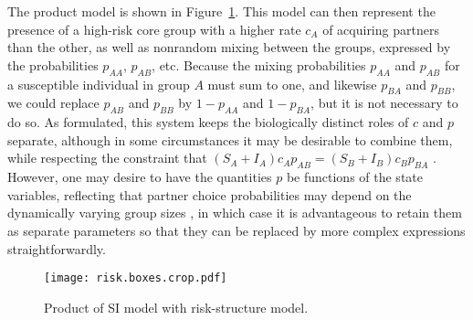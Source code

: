 \documentclass[review]{elsarticle}
\newcommand{\hl}[1]{#1}
\begin{document}
The product model is shown in \hl{Figure~\mbox{\ref{fig:risk}}}.
This model can then represent the presence of a high-risk
core group with a higher rate $c_A$ of acquiring partners than the other,
as well as nonrandom mixing between the groups, expressed by the
probabilities $p_{AA}$, $p_{AB}$, etc.
Because the mixing probabilities $p_{AA}$ and $p_{AB}$ for a
susceptible individual in group $A$ must sum to one,
and likewise $p_{BA}$ and $p_{BB}$,
we could replace $p_{AB}$ and $p_{BB}$ by $1-p_{AA}$ and $1-p_{BA}$,
but it is not necessary to do so.
As formulated, this system keeps the biologically distinct roles
of $c$ and $p$ separate, although in some circumstances it may
be desirable to combine them,
while respecting the constraint that
$(S_A+I_A) c_A p_{AB}=(S_B+I_B) c_B p_{BA}$
\cite{jacquez1988modeling}.
However, one may desire to have the quantities $p$ be functions
of the state variables, reflecting that partner choice probabilities
may depend on the dynamically varying group sizes
\cite{hethcote-proportionate96,anderson-gupta-ng1989},
in which case it is advantageous to retain them as separate parameters
so that they can be replaced by more complex expressions straightforwardly.



\begin{figure}
\centering
\texttt{[image: risk.boxes.crop.pdf]}

\caption{ \label{fig:risk}
Product of SI model with risk-structure model.
}
\end{figure}
\end{document}
